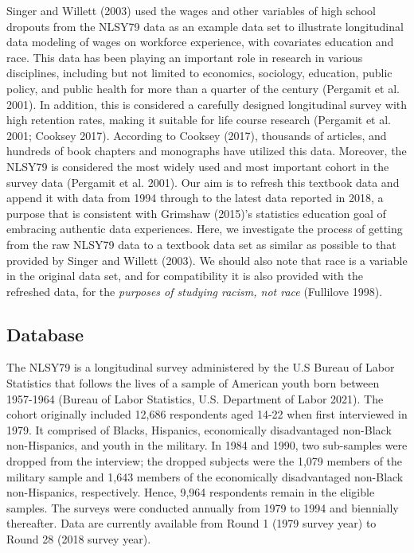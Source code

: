 \documentclass{article}
\begin{document}
Singer and Willett (2003) used the wages and other variables of high school dropouts from the NLSY79 data as an example data set to illustrate longitudinal data modeling of wages on workforce experience, with covariates education and race. This data has been playing an important role in research in various disciplines, including but not limited to economics, sociology, education, public policy, and public health for more than a quarter of the century (Pergamit et al. 2001). In addition, this is considered a carefully designed longitudinal survey with high retention rates, making it suitable for life course research (Pergamit et al. 2001; Cooksey 2017). According to Cooksey (2017), thousands of articles, and hundreds of book chapters and monographs have utilized this data. Moreover, the NLSY79 is considered the most widely used and most important cohort in the survey data (Pergamit et al. 2001).
Our aim is to refresh this textbook data and append it with data from 1994 through to the latest data reported in 2018, a purpose that is consistent with Grimshaw (2015)'s statistics education goal of embracing authentic data experiences. Here, we investigate the process of getting from the raw NLSY79 data to a textbook data set as similar as possible to that provided by Singer and Willett (2003). We should also note that race is a variable in the original data set, and for compatibility it is also provided with the refreshed data, for the \emph{purposes of studying racism, not race} (Fullilove 1998).

\hypertarget{database-1}{%
\subsection{Database}\label{database-1}}

The NLSY79 is a longitudinal survey administered by the U.S Bureau of Labor Statistics that follows the lives of a sample of American youth born between 1957-1964 (Bureau of Labor Statistics, U.S. Department of Labor 2021). The cohort originally included 12,686 respondents aged 14-22 when first interviewed in 1979. It comprised of Blacks, Hispanics, economically disadvantaged non-Black non-Hispanics, and youth in the military. In 1984 and 1990, two sub-samples were dropped from the interview; the dropped subjects were the 1,079 members of the military sample and 1,643 members of the economically disadvantaged non-Black non-Hispanics, respectively. Hence, 9,964 respondents remain in the eligible samples. The surveys were conducted annually from 1979 to 1994 and biennially thereafter. Data are currently available from Round 1 (1979 survey year) to Round 28 (2018 survey year).
\end{document}
